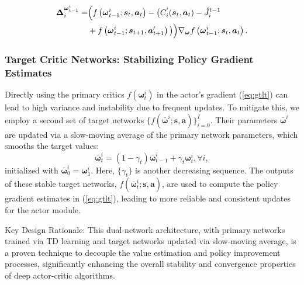 \documentclass{IEEEtran}
\begin{document}
\begin{align}
\boldsymbol{\Delta}_{i}^{\boldsymbol{\omega}_{t-1}^{i}}= & \Bigl(f\left(\boldsymbol{\omega}_{t-1}^{i};\boldsymbol{s}_{t},\boldsymbol{a}_{t}\right)-\bigl(C_{i}^{\text{'}}(\boldsymbol{s}_{t},\boldsymbol{a}_{t})-\hat{J}_{i}^{t-1}\label{eq:gradient term}\\
& +f\left(\boldsymbol{\omega}_{t-1}^{i};\boldsymbol{s}_{t+1},\boldsymbol{a}_{t+1}'\right)\bigl)\Bigr)\nabla_{\boldsymbol{\omega}}f\left(\boldsymbol{\omega}_{t-1}^{i};\boldsymbol{s}_{t},\boldsymbol{a}_{t}\right).\nonumber
\end{align}

\subsubsection{Target Critic Networks: Stabilizing Policy Gradient Estimates}
Directly using the primary critics $f(\boldsymbol{\omega}_{t}^{i})$ in the actor's gradient (\ref{eq:gtlt}) can lead to high variance and instability due to frequent updates. To mitigate this, we employ a second set of target networks $\{f(\bar{\boldsymbol{\omega}}^{i};\boldsymbol{s},\boldsymbol{a})\}_{i=0}^{I}$. Their parameters $\bar{\boldsymbol{\omega}}^{i}$ are updated via a slow-moving average of the primary network parameters, which smooths the target values:
\begin{equation}
\bar{\boldsymbol{\omega}}_{t}^{i}=\left(1-\gamma_{t}\right)\bar{\boldsymbol{\omega}}_{t-1}^{i}+\gamma_{t}\boldsymbol{\omega}_{t}^{i},\forall i,\label{eq:w^_}
\end{equation}
initialized with $\bar{\boldsymbol{\omega}}_{0}^{i}=\boldsymbol{\omega}_{1}^{i}$. Here, $\{\gamma_{t}\}$ is another decreasing sequence. The outputs of these stable target networks, $f(\bar{\boldsymbol{\omega}}_{t}^{i};\boldsymbol{s},\boldsymbol{a})$, are used to compute the policy gradient estimates in (\ref{eq:gtlt}), leading to more reliable and consistent updates for the actor module.

Key Design Rationale: This dual-network architecture, with primary networks trained via TD learning and target networks updated via slow-moving average, is a proven technique to decouple the value estimation and policy improvement processes, significantly enhancing the overall stability and convergence properties of deep actor-critic algorithms.
\end{document}
